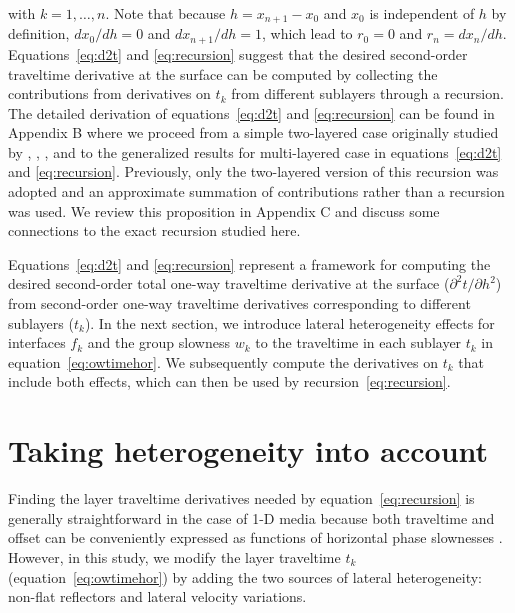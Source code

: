with $k = 1, \dots, n$. Note that because $h=x_{n+1}-x_0$ and $x_0$ is independent of $h$ by definition, $dx_0/dh = 0$ and $dx_{n+1}/dh = 1$, which lead to $r_0 = 0$ and $r_n = dx_{n}/dh$. Equations~\ref{eq:d2t} and \ref{eq:recursion} suggest that the desired second-order traveltime derivative at the surface can be computed by collecting the contributions from derivatives on $t_k$ from different sublayers through a recursion. The detailed derivation of equations~\ref{eq:d2t} and \ref{eq:recursion} can be found in Appendix B where we proceed from a simple two-layered case originally studied by \cite{blias1981}, \cite{bliasgrit1984}, \cite{gritsenko}, and \cite{goldin} to the generalized results for multi-layered case in equations~\ref{eq:d2t} and \ref{eq:recursion}. Previously, only the two-layered version of this recursion was adopted and an approximate summation of contributions rather than a recursion was used. We review this proposition in Appendix C and discuss some connections to the exact recursion studied here.

Equations~\ref{eq:d2t} and \ref{eq:recursion} represent a framework for computing the desired second-order total one-way traveltime derivative at the surface ($\partial^2 t/\partial h^2$) from second-order one-way traveltime derivatives corresponding to different sublayers ($t_k$). In the next section, we introduce lateral heterogeneity effects for interfaces $f_k$ and the group slowness $w_k$ to the traveltime in each sublayer $t_k$ in equation~\ref{eq:owtimehor}. We subsequently compute the derivatives on $t_k$ that include both effects, which can then be used by recursion~\ref{eq:recursion}.


\section{Taking heterogeneity into account}
Finding the layer traveltime derivatives needed by equation~\ref{eq:recursion} is generally straightforward in the case of 1-D media because both traveltime and offset can be conveniently expressed as functions of horizontal phase slownesses \cite[]{zoneinterval,korenravvetriclinic}. However, in this study, we modify the layer traveltime $t_k$ (equation~\ref{eq:owtimehor}) by adding the two sources of lateral heterogeneity: non-flat reflectors and lateral velocity variations.

